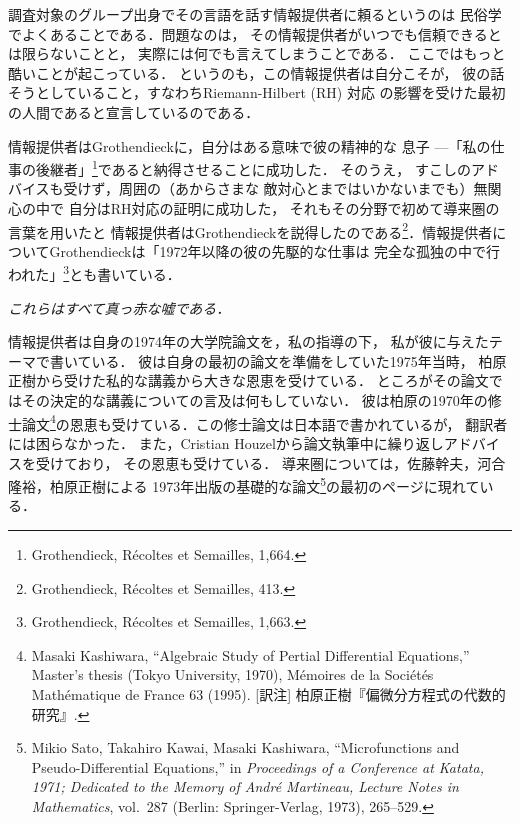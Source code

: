 \documentclass[9pt, a4paper, dvipdfmx]{jlreq}
\theoremstyle{definition}
\theoremstyle{mystyle}
\numberwithin{equation}{section} %
\begin{document}
調査対象のグループ出身でその言語を話す情報提供者に頼るというのは
民俗学でよくあることである．問題なのは，
その情報提供者がいつでも信頼できるとは限らないことと，
実際には何でも言えてしまうことである．
ここではもっと酷いことが起こっている．
というのも，この情報提供者は自分こそが，
彼の話そうとしていること，すなわちRiemann-Hilbert (RH) 対応
の影響を受けた最初の人間であると宣言しているのである．

情報提供者はGrothendieckに，自分はある意味で彼の精神的な
息子 ---「私の仕事の後継者」\footnote[21]{
    Grothendieck, R\'ecoltes et Semailles, 1,664.
}であると納得させることに成功した．
そのうえ，
すこしのアドバイスも受けず，周囲の（あからさまな
敵対心とまではいかないまでも）無関心の中で
自分はRH対応の証明に成功した，
それもその分野で初めて導来圏の言葉を用いたと
情報提供者はGrothendieckを説得したのである\footnote[22]{
    Grothendieck, R\'ecoltes et Semailles, 413.
}．情報提供者についてGrothendieckは「1972年以降の彼の先駆的な仕事は
完全な孤独の中で行われた」\footnote[23]{
    Grothendieck, R\'ecoltes et Semailles, 1,663.
}とも書いている．

\emph{これらはすべて真っ赤な嘘である．}

情報提供者は自身の1974年の大学院論文を，私の指導の下，
私が彼に与えたテーマで書いている．
彼は自身の最初の論文を準備をしていた1975年当時，
柏原正樹から受けた私的な講義から大きな恩恵を受けている．
ところがその論文ではその決定的な講義についての言及は何もしていない．
彼は柏原の1970年の修士論文\footnote[24]{
    Masaki Kashiwara, 
    ``Algebraic Study of Pertial Differential Equations,'' 
    Master's thesis (Tokyo University, 1970), 
    M\'emoires de la Soci\'et\'es Math\'ematique de 
    France 63 (1995).
    [訳注] 柏原正樹『偏微分方程式の代数的研究』.
}の恩恵も受けている．この修士論文は日本語で書かれているが，
翻訳者には困らなかった．
また，Cristian Houzelから論文執筆中に繰り返しアドバイスを受けており，
その恩恵も受けている．
導来圏については，佐藤幹夫，河合隆裕，柏原正樹による
1973年出版の基礎的な論文\footnote[25]{
    Mikio Sato,
    Takahiro Kawai,
    Masaki Kashiwara, 
    ``Microfunctions and Pseudo-Differential Equations,'' 
    in \textit{Proceedings of a Conference at Katata, 
    1971; Dedicated to the Memory of Andr\'e Martineau, 
    Lecture Notes in Mathematics}, 
    vol.~287 (Berlin: Springer-Verlag, 1973), 265--529.
}の最初のページに現れている．
\end{document}
